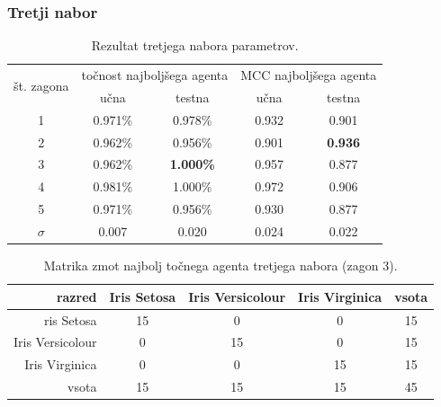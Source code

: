 \subsubsection{Tretji nabor}
\begin{table}[H]
    \caption{Rezultat tretjega nabora parametrov.}
    \begin{center}
        \begin{tabular}{|| c | c c || c c ||}
            \hline
            \multirow{2}{*}{št. zagona} & \multicolumn{2}{c||}{točnost najboljšega agenta} & \multicolumn{2}{c||}{MCC najboljšega agenta} \\ \cline{2-5}
            & učna    & testna           & učna  & testna         \\
            \hline
            1        & 0.971\% & 0.978\%          & 0.932 & 0.901          \\
            \hline
            2        & 0.962\% & 0.956\%          & 0.901 & \textbf{0.936} \\
            \hline
            3        & 0.962\% & \textbf{1.000\%} & 0.957 & 0.877          \\
            \hline
            4        & 0.981\% & 1.000\%          & 0.972 & 0.906          \\
            \hline
            5        & 0.971\% & 0.956\%          & 0.930 & 0.877          \\
            \hline
            $\sigma$ & 0.007   & 0.020            & 0.024 & 0.022          \\
            \hline
        \end{tabular}
    \end{center}
    \label{tab:iris_result_3}
\end{table}

\begin{table}[H]
    \centering
    \caption{Matrika zmot najbolj točnega agenta tretjega nabora (zagon 3).}
    \begin{tabular}{||rcccc||}
        \hline
        razred           & Iris Setosa & Iris Versicolour & Iris Virginica & vsota \\ \hline
        ris Setosa       & 15          & 0                & 0              & 15    \\ \hline
        Iris Versicolour & 0           & 15               & 0              & 15    \\ \hline
        Iris Virginica   & 0           & 0                & 15             & 15    \\ \hline
        vsota            & 15          & 15               & 15             & 45    \\ \hline
    \end{tabular}
    \label{tab:iris_acc_3}
\end{table}

